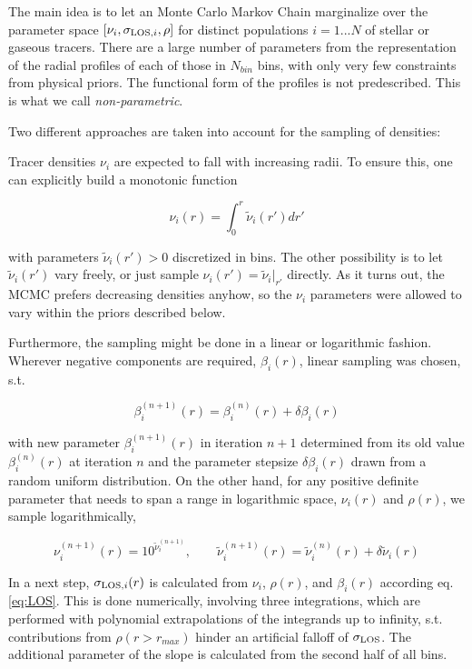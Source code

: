 The main idea is to let an Monte Carlo Markov Chain marginalize over
the parameter space $[\nu_i, \sigma_{\text{LOS},i}, \rho]$ for distinct populations
$i=1...N$ of stellar or gaseous tracers. There are a large number of
parameters from the representation of the radial profiles of each of
those in $N_{bin}$ bins, with only very few constraints from physical
priors. The functional form of the profiles is not predescribed. This
is what we call {\it non-parametric}.

Two different approaches are taken into account for the sampling of
densities:

Tracer densities $\nu_i$ are expected to fall with increasing
radii. To ensure this, one can explicitly build a monotonic function

\begin{equation}
\nu_i(r) = \int_0^r \tilde{\nu}_i(r')dr'
\end{equation}

with parameters $\tilde{\nu}_i(r')>0$ discretized in bins. The other
possibility is to let $\tilde{\nu}_i(r')$ vary freely, or just sample
$\nu_i(r')=\tilde{\nu}_i|_{r'}$ directly. As it turns out, the MCMC
prefers decreasing densities anyhow, so the $\nu_i$ parameters were
allowed to vary within the priors described below.

Furthermore, the sampling might be done in a linear or logarithmic
fashion. Wherever negative components are required, $\beta_i(r)$,
linear sampling was chosen, s.t.

\begin{equation}
\beta_i^{(n+1)}(r) = \beta_i^{(n)}(r) + \delta\beta_i(r)
\end{equation}

with new parameter $\beta_i^{(n+1)}(r)$ in iteration $n+1$ determined
from its old value $\beta_i^{(n)}(r)$ at iteration $n$ and the
parameter stepsize $\delta\beta_i(r)$ drawn from a random uniform
distribution. On the other hand, for any positive definite parameter
that needs to span a range in logarithmic space, $\nu_i(r)$ and
$\rho(r)$, we sample logarithmically,

\begin{equation}
\nu_i^{(n+1)}(r) = 10^{\tilde{\nu}_i^{(n+1)}},\qquad \tilde{\nu}_i^{(n+1)}(r) = \tilde{\nu}_i^{(n)}(r) + \delta\tilde{\nu}_i(r)
\end{equation}

In a next step, $\sigma_{\text{LOS},i}(r)$ is calculated from $\nu_i$, $\rho(r)$,
and $\beta_i(r)$ according eq. \ref{eq:LOS}. This is done numerically,
involving three integrations, which are performed with polynomial
extrapolations of the integrands up to infinity, s.t. contributions
from $\rho(r>r_{max})$ hinder an artificial falloff of $\sigma_{\text{LOS}}$. The
additional parameter of the slope is calculated from the second half
of all bins.

